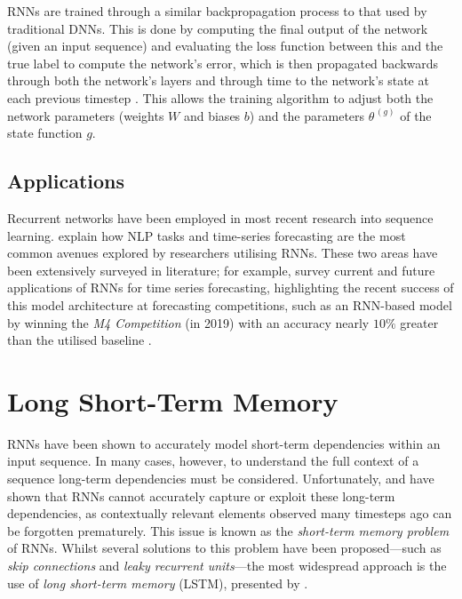 \documentclass[a4paper, 11pt]{report}
\begin{document}
    RNNs are trained through a similar backpropagation process to that used by traditional DNNs. This is done by computing the final output of the network (given an input sequence) and evaluating the loss function between this and the true label to compute the network's error, which is then propagated backwards through both the network's layers and through time to the network's state at each previous timestep \citep{zhang-2021}. This allows the training algorithm to adjust both the network parameters (weights $W$ and biases $b$) and the parameters $\theta^{\,(g)}$ of the state function $g$.


    \subsection{Applications}

    Recurrent networks have been employed in most recent research into sequence learning. \citet{lipton-2015} explain how NLP tasks and time-series forecasting are the most common avenues explored by researchers utilising RNNs. These two areas have been extensively surveyed in literature; for example, \citet{hewamalage-2021} survey current and future applications of RNNs for time series forecasting, highlighting the recent success of this model architecture at forecasting competitions, such as an RNN-based model by \citet{smyl-2020} winning the \emph{M4 Competition} (in 2019) with an accuracy nearly $10\%$ greater than the utilised baseline \citep{makridakis-2020}.


    \section{Long Short-Term Memory}

    RNNs have been shown to accurately model short-term dependencies within an input sequence. In many cases, however, to understand the full context of a sequence long-term dependencies must be considered. Unfortunately, \citet{hochreiter-1991} and \citet{bengio-1994} have shown that RNNs cannot accurately capture or exploit these long-term dependencies, as contextually relevant elements observed many timesteps ago can be forgotten prematurely. This issue is known as the \emph{short-term memory problem} of RNNs. Whilst several solutions to this problem have been proposed---such as \emph{skip connections} and \emph{leaky recurrent units}---the most widespread approach is the use of \emph{long short-term memory} (LSTM), presented by \citet{hochreiter-1997}.
\end{document}
